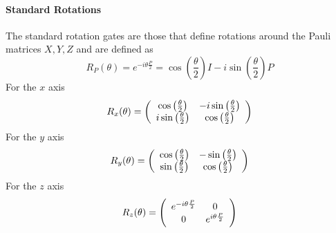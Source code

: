 \documentclass[10pt]{report}
\begin{document}
\paragraph{Standard Rotations}
The standard rotation gates are those that define rotations around the Pauli matrices $X, Y, Z$ and are defined as $$R_P(\theta) = e^{-i\theta\frac{P}{2}} = \cos\left(\frac{\theta}{2}\right)I-i\sin\left(\frac{\theta}{2}\right)P$$
For the $x$ axis
$$R_x(\theta) = \left(\begin{array}{c c}
\cos\left(\frac{\theta}{2}\right)&-i\sin\left(\frac{\theta}{2}\right)\\
i\sin\left(\frac{\theta}{2}\right)&\cos\left(\frac{\theta}{2}\right)
\end{array}\right)$$
For the $y$ axis
$$R_y(\theta) = \left(\begin{array}{c c}
\cos\left(\frac{\theta}{2}\right)&-\sin\left(\frac{\theta}{2}\right)\\
\sin\left(\frac{\theta}{2}\right)&\cos\left(\frac{\theta}{2}\right)
\end{array}\right)$$
For the $z$ axis
$$R_z(\theta) = \left(\begin{array}{c c}
e^{-i\theta\frac{P}{2}}&0\\
0&e^{i\theta\frac{P}{2}}
\end{array}\right)$$
\end{document}
